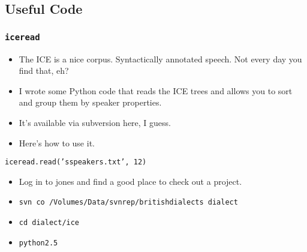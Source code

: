 \documentclass{beamer}
\begin{document}
\subsection{Useful Code}
\begin{frame}
  \frametitle{\tt iceread}
  \begin{itemize}
  \item The ICE is a nice corpus. Syntactically annotated speech. Not
    every day you find that, eh?
  \item I wrote some Python code that reads the ICE trees and allows you
    to sort and group them by speaker properties.
  \item It's available via subversion here, I guess.
  \item Here's how to use it.
  \end{itemize}
\end{frame}
\begin{frame}
    {\tt iceread.read('sspeakers.txt', 12)}
  \begin{itemize}
    \item Log in to jones and find a good place to check out a
      project.
  \item {\tt svn co /Volumes/Data/svnrep/britishdialects dialect}
    \item {\tt cd dialect/ice}
    \item {\tt python2.5} %
  \end{itemize} %
\end{frame}
\end{document}
